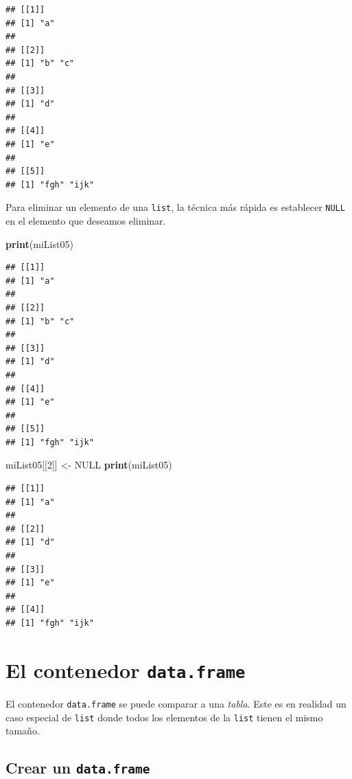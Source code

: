 \documentclass[
]{book}
\newenvironment{Shaded}{\begin{snugshade}}{\end{snugshade}}
\newcommand{\DecValTok}[1]{\textcolor[rgb]{0.00,0.00,0.81}{#1}}
\newcommand{\KeywordTok}[1]{\textcolor[rgb]{0.13,0.29,0.53}{\textbf{#1}}}
\newcommand{\NormalTok}[1]{#1}
\newcommand{\OtherTok}[1]{\textcolor[rgb]{0.56,0.35,0.01}{#1}}
\newcommand{\StringTok}[1]{\textcolor[rgb]{0.31,0.60,0.02}{#1}}
\begin{document}
\begin{verbatim}
## [[1]]
## [1] "a"
## 
## [[2]]
## [1] "b" "c"
## 
## [[3]]
## [1] "d"
## 
## [[4]]
## [1] "e"
## 
## [[5]]
## [1] "fgh" "ijk"
\end{verbatim}

Para eliminar un elemento de una \texttt{list}, la técnica más rápida es establecer \texttt{NULL} en el elemento que deseamos eliminar.

\begin{Shaded}
\begin{Highlighting}[]
\KeywordTok{print}\NormalTok{(miList05)}
\end{Highlighting}
\end{Shaded}

\begin{verbatim}
## [[1]]
## [1] "a"
## 
## [[2]]
## [1] "b" "c"
## 
## [[3]]
## [1] "d"
## 
## [[4]]
## [1] "e"
## 
## [[5]]
## [1] "fgh" "ijk"
\end{verbatim}

\begin{Shaded}
\begin{Highlighting}[]
\NormalTok{miList05[[}\DecValTok{2}\NormalTok{]] <-}\StringTok{ }\OtherTok{NULL}
\KeywordTok{print}\NormalTok{(miList05)}
\end{Highlighting}
\end{Shaded}

\begin{verbatim}
## [[1]]
## [1] "a"
## 
## [[2]]
## [1] "d"
## 
## [[3]]
## [1] "e"
## 
## [[4]]
## [1] "fgh" "ijk"
\end{verbatim}

\hypertarget{l014dataframe}{%
\section{\texorpdfstring{El contenedor \texttt{data.frame}}{El contenedor data.frame}}\label{l014dataframe}}

El contenedor \texttt{data.frame} se puede comparar a una \emph{tabla}. Este es en realidad un caso especial de \texttt{list} donde todos los elementos de la \texttt{list} tienen el mismo tamaño.

\hypertarget{crear-un-data.frame}{%
\subsection{\texorpdfstring{Crear un \texttt{data.frame}}{Crear un data.frame}}\label{crear-un-data.frame}}
\end{document}

